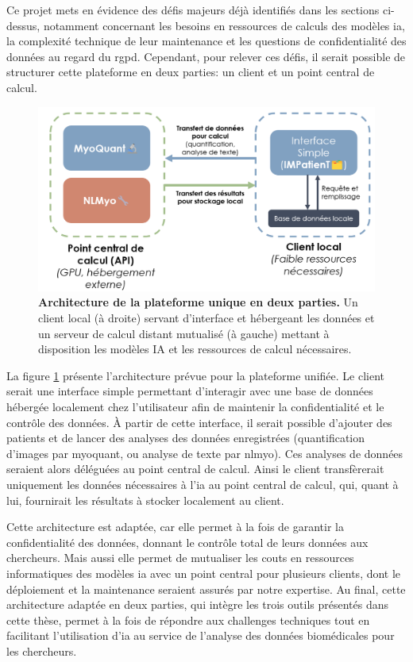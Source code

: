 Ce projet mets en évidence des défis majeurs déjà identifiés dans les sections ci-dessus, notamment concernant les besoins en ressources de calculs des modèles \gls{ia}, la complexité technique de leur maintenance et les questions de confidentialité des données au regard du \gls{rgpd}. Cependant, pour relever ces défis, il serait possible de structurer cette plateforme en deux parties: un client et un point central de calcul.
 \begin{figure}[!ht]
 \centering
 \includegraphics[width=1\textwidth]{figures/perspective_unique.png}
 \caption[Architecture de la plateforme unique en deux parties]{\textbf{Architecture de la plateforme unique en deux parties.} Un client local (à droite) servant d'interface et hébergeant les données et un serveur de calcul distant mutualisé (à gauche) mettant à disposition les modèles IA et les ressources de calcul nécessaires.}
 \label{fig:perspective_unique}
\end{figure}

La figure \ref{fig:perspective_unique} présente l'architecture prévue pour la plateforme unifiée. Le client serait une interface simple permettant d'interagir avec une base de données hébergée localement chez l'utilisateur afin de maintenir la confidentialité et le contrôle des données. À partir de cette interface, il serait possible d'ajouter des patients et de lancer des analyses des données enregistrées (quantification d'images par \gls{myoquant}, ou analyse de texte par \gls{nlmyo}). Ces analyses de données seraient alors déléguées au point central de calcul. Ainsi le client transfèrerait uniquement les données nécessaires à l'\gls{ia} au point central de calcul, qui, quant à lui, fournirait les résultats à stocker localement au client.

Cette architecture est adaptée, car elle permet à la fois de garantir la confidentialité des données, donnant le contrôle total de leurs données aux chercheurs. Mais aussi elle permet de mutualiser les couts en ressources informatiques des modèles \gls{ia} avec un point central pour plusieurs clients, dont le déploiement et la maintenance seraient assurés par notre expertise. Au final, cette architecture adaptée en deux parties, qui intègre les trois outils présentés dans cette thèse, permet à la fois de répondre aux challenges techniques tout en facilitant l'utilisation d'\gls{ia} au service de l'analyse des données biomédicales pour les chercheurs.
